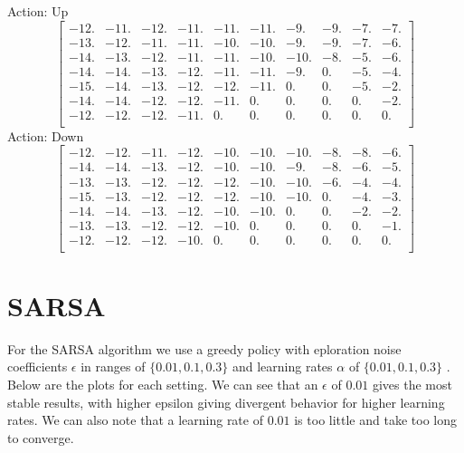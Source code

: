 \documentclass[11pt]{article}
\begin{document}
Action: Up
\[
\begin{bmatrix}
  -12. & -11. & -12. & -11. & -11. & -11. & -9. & -9. & -7. & -7.\\
  -13. & -12. & -11. & -11. & -10. & -10. & -9. & -9. & -7. & -6.\\
  -14. & -13. & -12. & -11. & -11. & -10. & -10. & -8. & -5. & -6.\\
  -14. & -14. & -13. & -12. & -11. & -11. & -9. & 0. & -5. & -4.\\
  -15. & -14. & -13. & -12. & -12. & -11. & 0. & 0. & -5. & -2.\\
  -14. & -14. & -12. & -12. & -11. & 0. & 0. & 0. & 0. & -2.\\
  -12. & -12. & -12. & -11. & 0. & 0. & 0. & 0. & 0. & 0.\\
\end{bmatrix}
\]
Action: Down
\[
\begin{bmatrix}
  -12. & -12. & -11. & -12. & -10. & -10. & -10. & -8. & -8. & -6.\\
  -14. & -14. & -13. & -12. & -10. & -10. & -9. & -8. & -6. & -5.\\
  -13. & -13. & -12. & -12. & -12. & -10. & -10. & -6. & -4. & -4.\\
  -15. & -13. & -12. & -12. & -12. & -10. & -10. & 0. & -4. & -3.\\
  -14. & -14. & -13. & -12. & -10. & -10. & 0. & 0. & -2. & -2.\\
  -13. & -13. & -12. & -12. & -10. & 0. & 0. & 0. & 0. & -1.\\
  -12. & -12. & -12. & -10. & 0. & 0. & 0. & 0. & 0. & 0.\\
\end{bmatrix}
\]

\section{SARSA}
For the SARSA algorithm we use a greedy policy with eploration noise coefficients $\epsilon$ in ranges of $\{ 0.01, 0.1, 0.3\}$ and learning rates $\alpha$ of $\{ 0.01, 0.1, 0.3\}$ . Below are the plots for each setting. We can see that an $\epsilon$ of $0.01$ gives the most stable results, with higher epsilon giving divergent behavior for higher learning rates. We can also note that a learning rate of $0.01$ is too little and take too long to converge.
\end{document}
